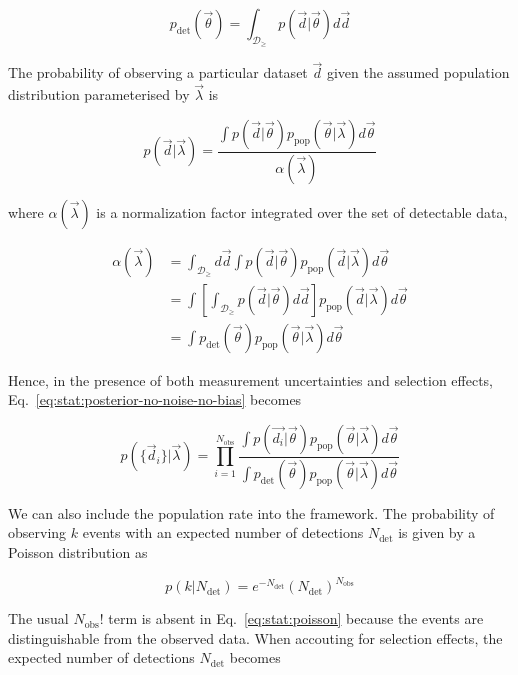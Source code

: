 \documentclass[%
preprint,
 amsmath,amssymb,
 aps,
]{revtex4-2}
\newcommand{\given}[2]{p( #1 | #2 )}
\newcommand{\ppop}[0]{p_{\text{pop}}}
\newcommand{\pdet}[0]{p_{\text{det}}}
\newcommand{\ndet}[0]{N_{\text{det}}}
\newcommand{\nobs}[0]{N_{\text{obs}}}
\begin{document}
\begin{equation}
	\pdet(\vec{\theta}) = \int_{\mathcal{D}_\geq} \given{\vec{d}}{\vec{\theta}}d\vec{d}
\end{equation}

The probability of observing a particular dataset $\vec{d}$ given the assumed population
distribution parameterised by $\vec{\lambda}$ is

\begin{equation}
	\given{\vec{d}}{\vec{\lambda}} =
	\frac{\int \given{\vec{d}}{\vec{\theta}} \ppop(\vec{\theta} | \vec{\lambda} ) d\vec{\theta}}{\alpha(\vec{\lambda})}
\end{equation}

where $\alpha(\vec{\lambda})$ is a normalization factor integrated over the set of detectable data,

\begin{align}
	\alpha(\vec{\lambda}) & =
	\int_{\mathcal{D}_\geq} d\vec{d} \int \given{\vec{d}}{\vec{\theta}} \ppop(\vec{d} | \vec{\lambda} ) d\vec{\theta}                                           \\
	                      & = \int \left[ \int_{\mathcal{D}_\geq} \given{\vec{d}}{\vec{\theta}} d\vec{d} \right]  \ppop(\vec{d} | \vec{\lambda} ) d\vec{\theta} \\
	\label{eq:stat:nalpha}
	                      & = \int \pdet(\vec{\theta}) \ppop(\vec{\theta} | \vec{\lambda} ) d\vec{\theta}
\end{align}

Hence, in the presence of both measurement uncertainties and selection effects,
Eq.~\eqref{eq:stat:posterior-no-noise-no-bias} becomes

\begin{equation}
	\given{\{ \vec{d}_i \}}{\vec{\lambda}} =
	\prod_{i=1}^{\nobs}
	\frac{\int \given{\vec{d_i}}{\vec{\theta}} \ppop(\vec{\theta} | \vec{\lambda} ) d\vec{\theta}}{\int \pdet(\vec{\theta}) \ppop(\vec{\theta} | \vec{\lambda} ) d\vec{\theta}}
\end{equation}

We can also include the population rate into the framework. The probability of observing $k$ events
with an expected number of detections $\ndet$ is given by a Poisson distribution as

\begin{equation}
	\label{eq:stat:poisson}
	\given{k}{\ndet} = e^{-\ndet}(\ndet)^{\nobs}
\end{equation}

The usual $\nobs !$ term is absent in Eq.~\eqref{eq:stat:poisson} because the events are
distinguishable from the observed data. When accouting for selection effects, the expected number
of detections $\ndet$ becomes
\end{document}

